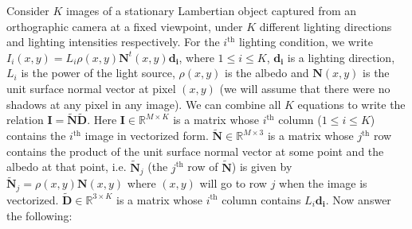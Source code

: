 \documentclass[11pt]{article}
\begin{document}
\maketitle

Consider $K$ images of a stationary Lambertian object captured from an orthographic camera at a fixed viewpoint, under $K$ different lighting directions and lighting intensities respectively. For the $i^{\textrm{th}}$ lighting condition, we write $I_i(x,y) = L_i \rho(x,y) \mathbf{N}^t(x,y) \mathbf{d_i}$, where $1 \leq i \leq K$, $\mathbf{d_i}$ is a lighting direction, $L_i$ is the power of the light source, $\rho(x,y)$ is the albedo and $\mathbf{N}(x,y)$ is the unit surface normal vector at pixel $(x,y)$ (we will assume that there were no shadows at any pixel in any image). We can combine all $K$ equations to write the relation $\mathbf{I} = \mathbf{\tilde{N}} \mathbf{\tilde{D}}$. Here $\mathbf{I} \in \mathbb{R}^{M \times K}$ is a matrix whose $i^{\textrm{th}}$ column ($1 \leq i \leq K$) contains the $i^{\textrm{th}}$ image in vectorized form. $\mathbf{\tilde{N}} \in \mathbb{R}^{M \times 3}$ is a matrix whose $j^{\textrm{th}}$ row contains the product of the unit surface normal vector at some point and the albedo at that point, i.e. $\mathbf{\tilde{N}}_j$ (the $j^{\textrm{th}}$ row of $\mathbf{\tilde{N}}$) is given by $\mathbf{\tilde{N}}_j = \rho(x,y) \mathbf{N}(x,y)$ where $(x,y)$ will go to row $j$ when the image is vectorized. $\mathbf{\tilde{D}} \in \mathbb{R}^{3 \times K}$ is a matrix whose $i^{\textrm{th}}$ column contains $L_i \mathbf{d_i}$. Now answer the following:
\end{document}
